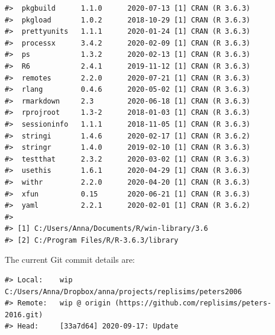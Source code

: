 \documentclass[
  english,
  doc,floatsintext,draftall]{apa6}
\begin{document}
\begin{verbatim}
#>  pkgbuild      1.1.0      2020-07-13 [1] CRAN (R 3.6.3)              
#>  pkgload       1.0.2      2018-10-29 [1] CRAN (R 3.6.3)              
#>  prettyunits   1.1.1      2020-01-24 [1] CRAN (R 3.6.3)              
#>  processx      3.4.2      2020-02-09 [1] CRAN (R 3.6.3)              
#>  ps            1.3.2      2020-02-13 [1] CRAN (R 3.6.3)              
#>  R6            2.4.1      2019-11-12 [1] CRAN (R 3.6.3)              
#>  remotes       2.2.0      2020-07-21 [1] CRAN (R 3.6.3)              
#>  rlang         0.4.6      2020-05-02 [1] CRAN (R 3.6.3)              
#>  rmarkdown     2.3        2020-06-18 [1] CRAN (R 3.6.3)              
#>  rprojroot     1.3-2      2018-01-03 [1] CRAN (R 3.6.3)              
#>  sessioninfo   1.1.1      2018-11-05 [1] CRAN (R 3.6.3)              
#>  stringi       1.4.6      2020-02-17 [1] CRAN (R 3.6.2)              
#>  stringr       1.4.0      2019-02-10 [1] CRAN (R 3.6.3)              
#>  testthat      2.3.2      2020-03-02 [1] CRAN (R 3.6.3)              
#>  usethis       1.6.1      2020-04-29 [1] CRAN (R 3.6.3)              
#>  withr         2.2.0      2020-04-20 [1] CRAN (R 3.6.3)              
#>  xfun          0.15       2020-06-21 [1] CRAN (R 3.6.3)              
#>  yaml          2.2.1      2020-02-01 [1] CRAN (R 3.6.2)              
#> 
#> [1] C:/Users/Anna/Documents/R/win-library/3.6
#> [2] C:/Program Files/R/R-3.6.3/library
\end{verbatim}

The current Git commit details are:

\begin{verbatim}
#> Local:    wip C:/Users/Anna/Dropbox/anna/projects/replisims/peters2006
#> Remote:   wip @ origin (https://github.com/replisims/peters-2016.git)
#> Head:     [33a7d64] 2020-09-17: Update
\end{verbatim}
\end{document}

